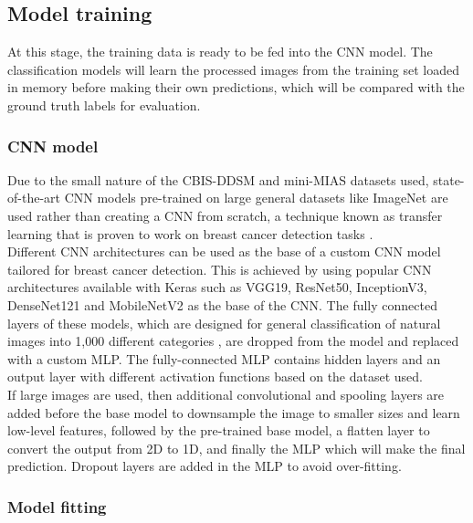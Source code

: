 


\subsection{Model training}

At this stage, the training data is ready to be fed into the CNN model. The classification models will learn the processed images from the training set loaded in memory before making their own predictions, which will be compared with the ground truth labels for evaluation.

\subsubsection{CNN model}

Due to the small nature of the CBIS-DDSM and mini-MIAS datasets used, state-of-the-art CNN models pre-trained on large general datasets like ImageNet are used rather than creating a CNN from scratch, a technique known as transfer learning that is proven to work on breast cancer detection tasks \citep{Shen2017, Falconi2019}.\\

Different CNN architectures can be used as the base of a custom CNN model tailored for breast cancer detection. This is achieved by using popular CNN architectures available with Keras such as VGG19, ResNet50, InceptionV3, DenseNet121 and MobileNetV2 as the base of the CNN. The fully connected layers of these models, which are designed for general classification of natural images into 1,000 different categories \citep{Krizhevsky2012}, are dropped from the model and replaced with a custom MLP. The fully-connected MLP contains hidden layers and an output layer with different activation functions based on the dataset used.\\

If large images are used, then additional convolutional and spooling layers are added before the base model to downsample the image to smaller sizes and learn low-level features, followed by the pre-trained base model, a flatten layer to convert the output from 2D to 1D, and finally the MLP which will make the final prediction. Dropout layers are added in the MLP to avoid over-fitting.

\subsubsection{Model fitting}

